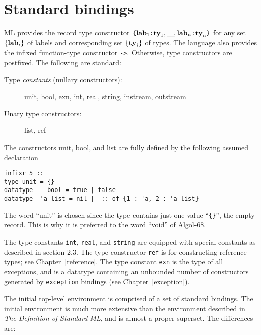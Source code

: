 \chapter{Standard bindings}
ML provides the record type constructor 
$ \verb"{" {\bf lab}_1 \verb":" {\bf ty}_1 , \underline{\ \ \ }
 , {\bf lab}_n \verb":" {\bf ty}_n \verb"}"$ for any set 
$\{ {\bf lab}_i \} $ of labels and corresponding set 
$\{ {\bf ty}_i \} $ of types.  The language also provides the infixed
function-type constructor \verb"->".  Otherwise, type constructors
are postfixed.  The following are standard:

\begin{description}
\item[Type {\em constants} (nullary constructors):]  unit, bool, exn, int,
real, string, instream, outstream
\item[Unary type constructors:]  list, ref
\end{description}

The constructors unit, bool, and list are fully defined by the
following assumed declaration
\begin{verbatim}
infixr 5 ::
type unit = {}
datatype    bool = true | false
datatype  'a list = nil |  :: of {1 : 'a, 2 : 'a list}
\end{verbatim}

The word ``unit'' is chosen since the type contains just one value
``\verb"{}"'', the empty record.  This is why it is preferred to the
word ``void'' of Algol-68.

The type constants \verb"int", \verb"real", and \verb"string"
are equipped with special
constants as described in section 2.3.  The type constructor
\verb"ref" is for constructing reference types; see
Chapter~\ref{reference}.
The type constant \verb"exn" is the type of all exceptions, and
is a datatype containing an unbounded number of constructors
generated by \verb"exception" bindings (see Chapter~\ref{exception}).



The initial top-level environment is comprised of a set of standard
bindings.  The initial environment is much more extensive than the
environment described in {\it The Definition of Standard ML}, and
is almost a proper superset.  The differences are:

